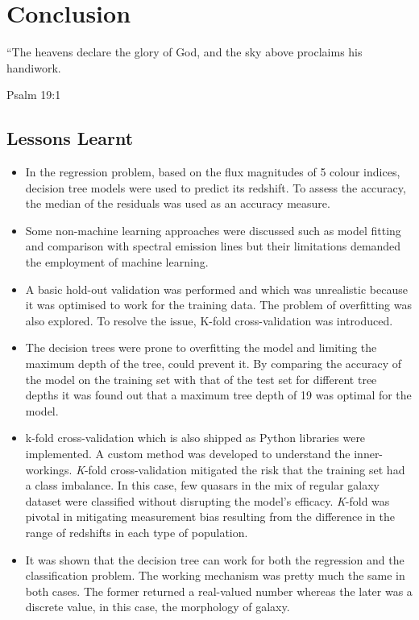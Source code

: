 \section{Conclusion}

\epigraph{\justify``The heavens declare the glory of God, and the sky above proclaims his handiwork.}{Psalm 19:1}

\subsection{Lessons Learnt}
\begin{itemize}
	
	\item In the regression problem, based on the flux magnitudes of 5 colour indices, decision tree models were used to predict its redshift. To assess the accuracy, the median of the residuals was used as an accuracy measure.
	
	\item Some non-machine learning approaches were discussed such as model fitting and comparison with spectral emission lines but their limitations demanded the employment of machine learning.
	
	\item A basic hold-out validation was performed and which was unrealistic because it was optimised to work for the training data. The problem of overfitting was also explored. To resolve the issue, K-fold cross-validation was introduced.
	
	\item The decision trees were prone to overfitting the model and limiting the maximum depth of the tree, could prevent it. By comparing the accuracy of the model on the training set with that of the test set for different tree depths it was found out that a maximum tree depth of 19 was optimal for the model.
	
	\item k-fold cross-validation which is also shipped as Python libraries were implemented. A custom method was developed to understand the inner-workings. \textit{K}-fold cross-validation mitigated the risk that the training set had a class imbalance. In this case, few quasars in the mix of regular galaxy dataset were classified without disrupting the model's efficacy. \textit{K}-fold was pivotal in mitigating measurement bias resulting from the difference in the range of redshifts in each type of population.
	
	\item It was shown that the decision tree can work for both the regression and the classification problem. The working mechanism was pretty much the same in both cases. The former returned a real-valued number whereas the later was a discrete value, in this case, the morphology of galaxy. 
	

\end{itemize}
